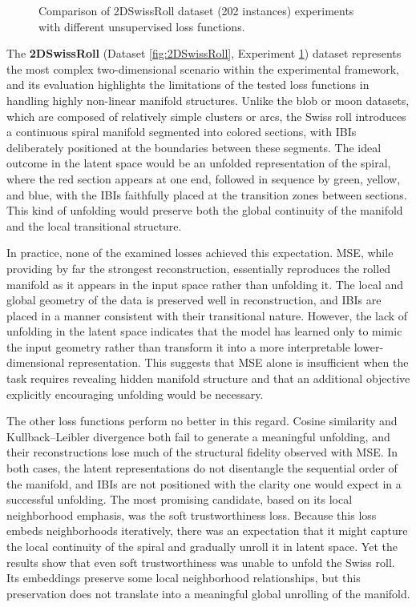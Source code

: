 \begin{figure}[htbp]
  \caption{Comparison of 2DSwissRoll dataset (202 instances) experiments with different unsupervised loss functions.}
  \label{fig:RQ2/2DSwissRoll}
\end{figure}

The \textbf{2DSwissRoll} (Dataset \ref{fig:2DSwissRoll}, Experiment \ref{fig:RQ2/2DSwissRoll}) dataset represents the most complex two-dimensional scenario within the experimental framework, and its evaluation highlights the limitations of the tested loss functions in handling highly non-linear manifold structures. Unlike the blob or moon datasets, which are composed of relatively simple clusters or arcs, the Swiss roll introduces a continuous spiral manifold segmented into colored sections, with IBIs deliberately positioned at the boundaries between these segments. The ideal outcome in the latent space would be an unfolded representation of the spiral, where the red section appears at one end, followed in sequence by green, yellow, and blue, with the IBIs faithfully placed at the transition zones between sections. This kind of unfolding would preserve both the global continuity of the manifold and the local transitional structure.

In practice, none of the examined losses achieved this expectation. MSE, while providing by far the strongest reconstruction, essentially reproduces the rolled manifold as it appears in the input space rather than unfolding it. The local and global geometry of the data is preserved well in reconstruction, and IBIs are placed in a manner consistent with their transitional nature. However, the lack of unfolding in the latent space indicates that the model has learned only to mimic the input geometry rather than transform it into a more interpretable lower-dimensional representation. This suggests that MSE alone is insufficient when the task requires revealing hidden manifold structure and that an additional objective explicitly encouraging unfolding would be necessary.

The other loss functions perform no better in this regard. Cosine similarity and Kullback–Leibler divergence both fail to generate a meaningful unfolding, and their reconstructions lose much of the structural fidelity observed with MSE. In both cases, the latent representations do not disentangle the sequential order of the manifold, and IBIs are not positioned with the clarity one would expect in a successful unfolding. The most promising candidate, based on its local neighborhood emphasis, was the soft trustworthiness loss. Because this loss embeds neighborhoods iteratively, there was an expectation that it might capture the local continuity of the spiral and gradually unroll it in latent space. Yet the results show that even soft trustworthiness was unable to unfold the Swiss roll. Its embeddings preserve some local neighborhood relationships, but this preservation does not translate into a meaningful global unrolling of the manifold.

